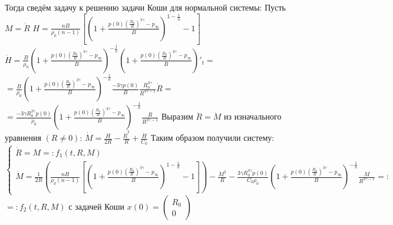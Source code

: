 \documentclass[a4paper,14pt]{article}
\begin{document}
\indent Тогда сведём задачу к решению задачи Коши для нормальной системы:\newline
Пусть $M=\dot{R}$\newline
$H=\frac{nB}{\rho_0 (n-1)}\left[\left(1+\frac{p(0)\left(\frac{R_0}{R}\right)^{3\gamma}-p_{\infty}}{B}\right)^{1-\frac{1}{n}}-1 \right]$\newline
$\dot{H}=\frac{B}{\rho_0}\left(1+\frac{p(0)\left(\frac{R_0}{R}\right)^{3\gamma}-p_{\infty}}{B}\right)^{-\frac{1}{n}}\left(1+\frac{p(0)\left(\frac{R_0}{R}\right)^{3\gamma}-p_{\infty}}{B}\right)'_t=$\newline
$=\frac{B}{\rho_0}\left(1+\frac{p(0)\left(\frac{R_0}{R}\right)^{3\gamma}-p_{\infty}}{B}\right)^{-\frac{1}{n}}\frac{-3\gamma p(0)}{B}\frac{R_0^{3\gamma}}{R^{3\gamma-1}}\dot{R}=$\newline
$=\frac{-3\gamma R_0^{3\gamma}p(0)}{\rho_0}\left(1+\frac{p(0)\left(\frac{R_0}{R}\right)^{3\gamma}-p_{\infty}}{B}\right)^{-\frac{1}{n}}\frac{\dot{R}}{R^{3\gamma-1}}$\newline
Выразим $\ddot{R}=\dot{M}$ из изначального уравнения $(R\neq 0)$:\newline
$\dot{M}=\frac{H}{2R}-\frac{\dot{R}^2}{R}+\frac{\dot{H}}{C_0}$\newline
Таким образом получили систему:\newline
$
\begin{cases}
\dot{R}=M=:f_1(t,R,M) \\
\dot{M}=\frac{1}{2R}\left(\frac{nB}{\rho_0 (n-1)}\left[\left(1+\frac{p(0)\left(\frac{R_0}{R}\right)^{3\gamma}-p_{\infty}}{B}\right)^{1-\frac{1}{n}}-1 \right]\right)-\frac{M^2}{R}-\frac{3\gamma R_0^{3\gamma}p(0)}{C_0 \rho_0}\left(1+\frac{p(0)\left(\frac{R_0}{R}\right)^{3\gamma}-p_{\infty}}{B}\right)^{-\frac{1}{n}}\frac{M}{R^{3\gamma-1}}=:
\end{cases}
$\newline
$=:f_2(t,R,M)$\newline
с задачей Коши $x(0)=\begin{pmatrix}R_0 \\ 0\end{pmatrix}$\newline
\end{document}

